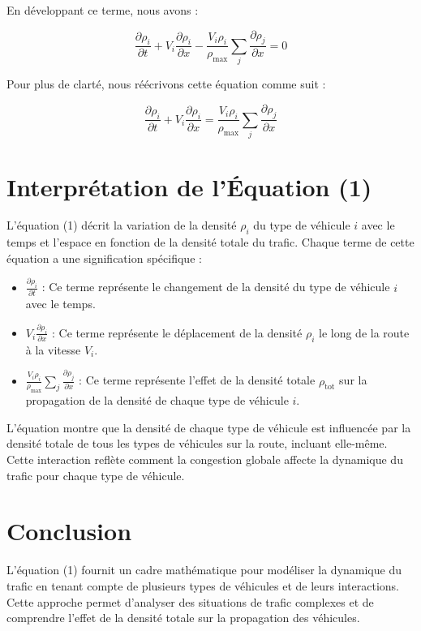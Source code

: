 \documentclass[a4paper,12pt]{article}
\begin{document}
En développant ce terme, nous avons :

\[
\frac{\partial \rho_i}{\partial t} + V_i \frac{\partial \rho_i}{\partial x} - \frac{V_i \rho_i}{\rho_{\text{max}}} \sum_j \frac{\partial \rho_j}{\partial x} = 0
\]

Pour plus de clarté, nous réécrivons cette équation comme suit :

\[
\frac{\partial \rho_i}{\partial t} + V_i \frac{\partial \rho_i}{\partial x} = \frac{V_i \rho_i}{\rho_{\text{max}}} \sum_j \frac{\partial \rho_j}{\partial x}
\]

\section{Interprétation de l'Équation (1)}

L'équation (1) décrit la variation de la densité \(\rho_i\) du type de véhicule \(i\) avec le temps et l'espace en fonction de la densité totale du trafic. Chaque terme de cette équation a une signification spécifique :

\begin{itemize}
    \item \(\frac{\partial \rho_i}{\partial t}\) : Ce terme représente le changement de la densité du type de véhicule \(i\) avec le temps.
    \item \(V_i \frac{\partial \rho_i}{\partial x}\) : Ce terme représente le déplacement de la densité \(\rho_i\) le long de la route à la vitesse \(V_i\).
    \item \(\frac{V_i \rho_i}{\rho_{\text{max}}} \sum_j \frac{\partial \rho_j}{\partial x}\) : Ce terme représente l'effet de la densité totale \(\rho_{\text{tot}}\) sur la propagation de la densité de chaque type de véhicule \(i\).
\end{itemize}

L'équation montre que la densité de chaque type de véhicule est influencée par la densité totale de tous les types de véhicules sur la route, incluant elle-même. Cette interaction reflète comment la congestion globale affecte la dynamique du trafic pour chaque type de véhicule.

\section{Conclusion}

L'équation (1) fournit un cadre mathématique pour modéliser la dynamique du trafic en tenant compte de plusieurs types de véhicules et de leurs interactions. Cette approche permet d'analyser des situations de trafic complexes et de comprendre l'effet de la densité totale sur la propagation des véhicules.
\end{document}
